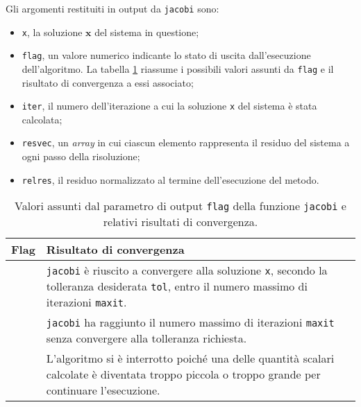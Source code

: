 Gli argomenti restituiti in output da \lstinline|jacobi| sono:
\begin{itemize}
    \item \lstinline|x|, la soluzione $\mathbf{x}$ del sistema in questione;
    \item \lstinline|flag|, un valore numerico indicante lo stato di uscita dall'esecuzione dell'algoritmo. La tabella \ref{tab:flagJacobi} riassume i possibili valori assunti da \lstinline|flag| e il risultato di convergenza a essi associato;
    \item \lstinline|iter|, il numero dell'iterazione a cui la soluzione \lstinline|x| del sistema \`e stata calcolata;
    \item \lstinline|resvec|, un \textit{array} in cui ciascun elemento rappresenta il residuo del sistema a ogni passo della risoluzione;
    \item \lstinline|relres|, il residuo normalizzato al termine dell'esecuzione del metodo.
\end{itemize}
\begin{table}[htbp]
    \renewcommand{\arraystretch}{1.2}
    \centering
    \begin{tabularx}{\textwidth}{@{} >{\centering\arraybackslash}m{1.5cm} X @{}}
        \toprule
        Flag & Risultato di convergenza \\
        \midrule
        0 & \lstinline{jacobi} è riuscito a convergere alla soluzione \lstinline{x}, secondo la tolleranza desiderata \lstinline{tol}, entro il numero massimo di iterazioni \lstinline{maxit}. \\
        \addlinespace
        1 & \lstinline{jacobi} ha raggiunto il numero massimo di iterazioni \lstinline{maxit} senza convergere alla tolleranza richiesta. \\
        \addlinespace
        2 & L'algoritmo si è interrotto poiché una delle quantità scalari calcolate è diventata troppo piccola o troppo grande per continuare l'esecuzione. \\
        \bottomrule
    \end{tabularx}
    \caption{Valori assunti dal parametro di output \lstinline{flag} della funzione \lstinline{jacobi} e relativi risultati di convergenza.}
    \label{tab:flagJacobi}
\end{table}
